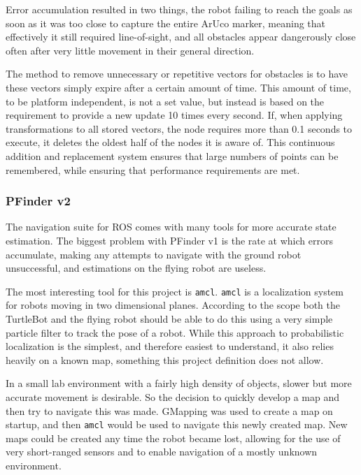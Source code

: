 \documentclass{article}[12]
\begin{document}
 	Error accumulation resulted in two things, the robot failing to reach the goals as soon as it was too close to capture the entire ArUco marker, meaning that effectively it still required line-of-sight, and all obstacles appear dangerously close often after very little movement in their general direction. 


	The method to remove unnecessary or repetitive vectors for obstacles is to have these vectors simply expire after a certain amount of time. This amount of time, to be platform independent, is not a set value, but instead is based on the requirement to provide a new update 10 times every second. If, when applying transformations to all stored vectors, the node requires more than 0.1 seconds to execute, it deletes the oldest half of the nodes it is aware of. This continuous addition and replacement system ensures that large numbers of points can be remembered, while ensuring that performance requirements are met.
	
	\subsubsection{PFinder v2}
	
	The navigation suite for ROS comes with many tools for more accurate state estimation. The biggest problem with PFinder v1 is the rate at which errors accumulate, making any attempts to navigate with the ground robot unsuccessful, and estimations on the flying robot are useless.
	
	The most interesting tool for this project is \texttt{amcl}. \texttt{amcl} is a localization system for robots moving in two dimensional planes. According to the scope both the TurtleBot and the flying robot should be able to do this using a very simple particle filter to track the pose of a robot. While this approach to probabilistic localization is the simplest, and therefore easiest to understand, it also relies heavily on a known map, something this project definition does not allow.
	
	In a small lab environment with a fairly high density of objects, slower but more accurate movement is desirable. So the decision to quickly develop a map and then try to navigate this was made. GMapping was used to create a map on startup, and then \texttt{amcl} would be used to navigate this newly created map. New maps could be created any time the robot became lost, allowing for the use of very short-ranged sensors and to enable navigation of a mostly unknown environment.
	
\end{document}
